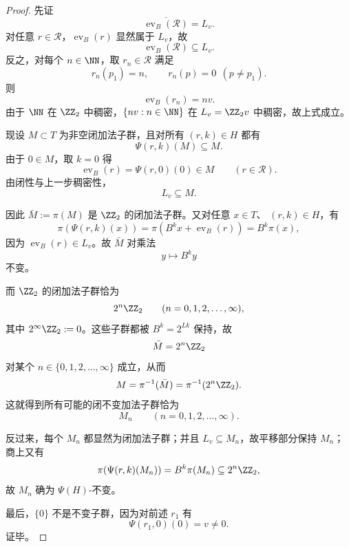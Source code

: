 \begin{proof}
先证
\[
\overline{\operatorname{ev}_B(\mathcal R)}=L_v.
\]
对任意 \(r\in\mathcal R\)，\(\operatorname{ev}_B(r)\) 显然属于 \(L_v\)，故
\[
\operatorname{ev}_B(\mathcal R)\subseteq L_v.
\]
反之，对每个 \(n\in\NN\)，取 \(r_n\in\mathcal R\) 满足
\[
r_n(p_1)=n,
\qquad
r_n(p)=0\ \ (p\neq p_1).
\]
则
\[
\operatorname{ev}_B(r_n)=nv.
\]
由于 \(\NN\) 在 \(\ZZ_2\) 中稠密，\(\{nv:n\in\NN\}\) 在 \(L_v=\ZZ_2v\) 中稠密，故上式成立。

现设 \(M\subset T\) 为非空闭加法子群，且对所有 \((r,k)\in H\) 都有
\[
\Psi(r,k)(M)\subseteq M.
\]
由于 \(0\in M\)，取 \(k=0\) 得
\[
\operatorname{ev}_B(r)=\Psi(r,0)(0)\in M
\qquad (r\in\mathcal R).
\]
由闭性与上一步稠密性，
\[
L_v\subseteq M.
\]

因此 \(\bar M:=\pi(M)\) 是 \(\ZZ_2\) 的闭加法子群。又对任意 \(x\in T\)、
\((r,k)\in H\)，有
\[
\pi(\Psi(r,k)(x))
=
\pi(B^k x+\operatorname{ev}_B(r))
=
B^k\pi(x),
\]
因为 \(\operatorname{ev}_B(r)\in L_v\)。故 \(\bar M\) 对乘法
\[
y\longmapsto B^k y
\]
不变。

而 \(\ZZ_2\) 的闭加法子群恰为
\[
2^n\ZZ_2\qquad (n=0,1,2,\dots,\infty),
\]
其中 \(2^\infty\ZZ_2:=0\)。这些子群都被 \(B^k=2^{Lk}\) 保持，故
\[
\bar M=2^n\ZZ_2
\]
对某个 \(n\in\{0,1,2,\dots,\infty\}\) 成立，从而
\[
M=\pi^{-1}(\bar M)=\pi^{-1}(2^n\ZZ_2).
\]
这就得到所有可能的闭不变加法子群恰为
\[
M_n\qquad (n=0,1,2,\dots,\infty).
\]

反过来，每个 \(M_n\) 都显然为闭加法子群；并且 \(L_v\subseteq M_n\)，故平移部分保持
\(M_n\)；商上又有
\[
\pi(\Psi(r,k)(M_n))=B^k\pi(M_n)\subseteq 2^n\ZZ_2,
\]
故 \(M_n\) 确为 \(\Psi(H)\)-不变。

最后，\(\{0\}\) 不是不变子群，因为对前述 \(r_1\) 有
\[
\Psi(r_1,0)(0)=v\neq 0.
\]
证毕。
\end{proof}

